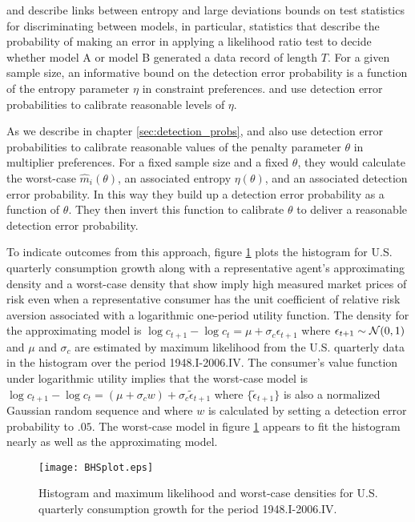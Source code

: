 \citet{ahs2003} and \citet{hs2009} describe  links  between entropy and large deviations bounds on  test statistics for discriminating between models, in particular,
statistics that describe the probability of making an error in applying a likelihood ratio test to decide  whether model A or model B generated a data record of length $T$.
 For a given sample size, an informative bound on the detection error probability is a function of the entropy parameter  $\eta$ in constraint preferences.  \citet{hsw2002} and \citet{ahs2003} use detection error probabilities to calibrate reasonable levels of $\eta$.

As we describe in chapter \ref{sec:detection_probs},  \citet{ahs2003} and \citet[ch.~9]{hsmonograph} also use detection error probabilities to calibrate reasonable values of the penalty parameter $\theta$ in multiplier preferences.
For a fixed sample size and a fixed $\theta$, they would calculate the worst-case $\hat m_i(\theta)$, an associated entropy $\eta(\theta)$, and an associated detection error probability.  In this way they build up a detection error
 probability as a function of $\theta$.  They then invert this function to  calibrate $\theta$ to deliver a reasonable detection error probability.

To indicate outcomes from  this approach, figure \ref{fig_BHS_plot} plots the histogram for U.S. quarterly consumption growth
along with a representative agent's  approximating density and  a worst-case
density that \citet{bhs2007} show imply high measured market prices of risk
even when a representative consumer has the unit coefficient of relative risk aversion associated with a logarithmic
 one-period utility function.  The density for the approximating model
is $\log c_{t+1} - \log c_t = \mu + \sigma_c \epsilon_{t+1}$ where $\epsilon_{t+1} \sim {\cal N}(0,1)$
and $\mu$ and $\sigma_c$ are estimated by maximum likelihood from the U.S. quarterly data in the histogram
 over the period 1948.I-2006.IV. The consumer's value function under logarithmic utility implies that the worst-case model is  $\log c_{t+1} - \log c_t = (\mu + \sigma_c w)  + \sigma_c \tilde \epsilon_{t+1}$ where $\{\tilde \epsilon_{t+1}\}$ is also a
normalized Gaussian random sequence and  where $w$ is calculated by
setting a  detection error probability to $.05$. The worst-case model in figure \ref{fig_BHS_plot} appears to fit the histogram nearly as well as the  approximating model.

\begin{figure}[htp]
\centering
\texttt{[image: BHSplot.eps]}
\caption[Histogram and maximum likelihood and worst-case densities]{Histogram and maximum likelihood and worst-case densities for U.S. quarterly consumption growth for the period 1948.I-2006.IV. }\label{fig_BHS_plot}
\end{figure}


